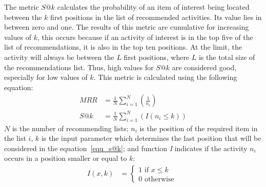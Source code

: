 \documentclass[10pt,letterpaper]{article}
\begin{document}
The metric \(S@k\) calculates the probability of an item of interest being located between the \(k\) first positions in the list of recommended activities. Its value ​​lies in between zero and one. The results of this metric are cumulative for increasing values ​​of \(k\), this occurs because if an activity of interest is in the top five of the list of recommendations, it is also in the top ten positions. At the limit, the activity will always be between the \(L\) first positions, where \(L\) is the total size of the recommendations list. Thus, high values ​​for $S@k$ are considered good, especially for low values ​​of $k$. This metric is calculated using the following equation:
\begin{align}
MRR &= \frac{1}{N} \sum\limits_{i=1}^{N} \left( \frac{1}{n_{i}} \right) 		\label{equ_mrr}\\
S@k &= \frac{1}{N} \sum\limits_{i=1}^{N} \left( I(n_{i} \leq k) \right)			\label{equ_s@k}
\end{align}
\(N\) is the number of recommending lists; \(n_{i}\) is the position of the required item in the list \(i\), \(k\) is the input parameter which determines the last position that will be considered in the equation~\eqref{equ_s@k}; and function \emph{I} indicates if the activity \(n_{i}\) occurs in a position smaller or equal to \(k\):
\begin{align}
I(x, k)   &= \begin{cases} \label{equ_indicativa}
1 \textrm{ if } x \leq k \\
0 \textrm{ otherwise }
\end{cases}
\end{align}

\end{document}
